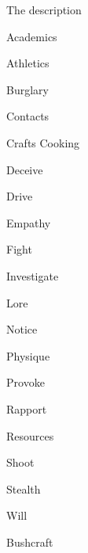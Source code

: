 \begin{npcBox}[title=Stef a Norm investigator]
    \begin{consequences}
    \item {}
    \item {}
    \item {}
    \end{consequences}
    
    \begin{npcDescription}
    The description
    \end{npcDescription}
    
\end{npcBox}


\begin{npcBox}[title=Gutenberg a Lost trapper and cook]

    \begin{aspects}
    \item {}
    \item {}
    \item {}
    \end{aspects}
    
    \begin{skills}
        \item {} Academics
        \item {} Athletics
        \item {} Burglary
        \item {} Contacts
        \item {} Crafts Cooking
        \item {} Deceive
        \item {} Drive
        \item {} Empathy
        \item {} Fight
        \item {} Investigate
        \item {} Lore
        \item {} Notice
        \item {} Physique
        \item {} Provoke
        \item {} Rapport
        \item {} Resources
        \item {} Shoot
        \item {} Stealth
        \item {} Will
        \item {} Bushcraft
     \end{skills}
    

\end{npcBox}
